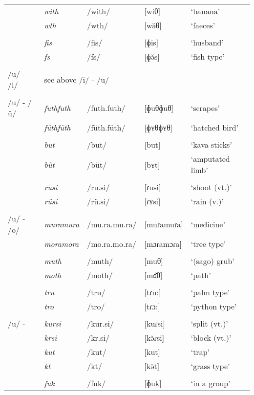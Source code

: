 \begin{table}
\begin{tabularx}{\textwidth}{lllll}
		& \emph{with} & /with/ &[wiθ] & `banana'\\
		& \emph{wth} & /wth/ &[wə̆θ]&	`faeces'\\
		&&&&\\
		& \emph{fis} & /fis/ & [ɸis] & `husband'\\
		& \emph{fs} & /fs/ & [ɸə̆s] & `fish type'\\
		&&&&\\
		/u/ - /i/ & \multicolumn{4}{l}{see above /i/ - /u/}\\
		&&&&\\
		/u/ - /ü/ & \emph{futhfuth} & /futh.futh/ & [ɸuθɸuθ] & `scrapes'\\
		& \emph{füthfüth} & /füth.füth/ & [ɸʏθɸʏθ] & `hatched bird'\\
		&&&&\\
		& \emph{but} & /but/ & [\super{m}but] & `kava sticks'\\
		& \emph{büt} & /büt/ & [\super{m}bʏt] & `amputated limb'\\
		&&&&\\
		& \emph{rusi} & /ru.si/ & [ɾusi] & `shoot (vt.)'\\
		& \emph{rüsi} & /rü.si/ & [ɾʏsi] & `rain (v.)'\\
		&&&&\\
		/u/ - /o/ & \emph{muramura} & /mu.ra.mu.ra/ & [muɾamuɾa] & `medicine'\\
		& \emph{moramora} & /mo.ra.mo.ra/ & [mɔɾamɔɾa] & `tree type'\\
		&&&&\\
		& \emph{muth} & /muth/ & [muθ] & `(sago) grub'\\
		& \emph{moth} & /moth/ & [mɞ̆θ] & `path'\\
		&&&&\\
		& \emph{tru} & /tru/ & [tɾu:] & `palm type'\\
		& \emph{tro} & /tro/ & [tɾɔ:] & `python type'\\
		&&&&\\
		/u/ - \Zero{} & \emph{kursi} & /kur.si/ & [kuɾsi] & `split (vt.)'\\
		& \emph{krsi}  & /kr.si/  &	[kə̆ɾsi] & `block (vt.)'\\
		& \emph{kut} & /kut/ & [kut] & `trap'\\
		& \emph{kt} & /kt/ & [kə̆t] & `grass type'\\
		&&&&\\
		& \emph{fuk} & /fuk/ & [ɸuk] & `in a group'\\

\end{tabularx}
\end{table}
